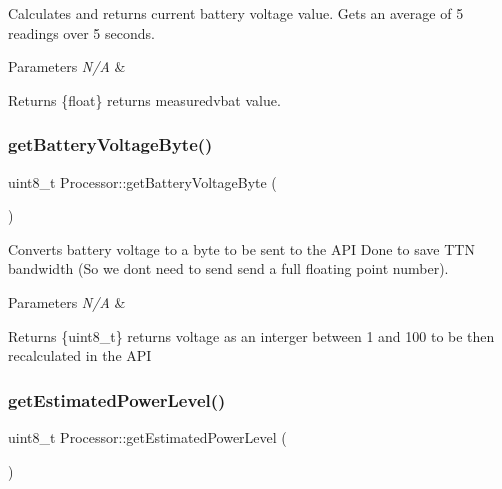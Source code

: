 Calculates and returns current battery voltage value. Gets an average of 5 readings over 5 seconds. 
\begin{DoxyParams}{Parameters}
{\em N/A} & \\
\hline
\end{DoxyParams}
\begin{DoxyReturn}{Returns}
\{float\} returns measuredvbat value. 
\end{DoxyReturn}
\mbox{\label{class_processor_ae2385e41f86895199fb37e524a3f1e86}} 
\subsubsection{\texorpdfstring{get\+Battery\+Voltage\+Byte()}{getBatteryVoltageByte()}}
{\footnotesize\ttfamily uint8\+\_\+t Processor\+::get\+Battery\+Voltage\+Byte (\begin{DoxyParamCaption}{ }\end{DoxyParamCaption})}

Converts battery voltage to a byte to be sent to the A\+PI Done to save T\+TN bandwidth (So we don\textquotesingle{}t need to send send a full floating point number). 
\begin{DoxyParams}{Parameters}
{\em N/A} & \\
\hline
\end{DoxyParams}
\begin{DoxyReturn}{Returns}
\{uint8\+\_\+t\} returns voltage as an interger between 1 and 100 to be then recalculated in the A\+PI 
\end{DoxyReturn}
\mbox{\label{class_processor_a78b74d3be91182a263f77ff0f250408d}} 
\subsubsection{\texorpdfstring{get\+Estimated\+Power\+Level()}{getEstimatedPowerLevel()}}
{\footnotesize\ttfamily uint8\+\_\+t Processor\+::get\+Estimated\+Power\+Level (\begin{DoxyParamCaption}{ }\end{DoxyParamCaption})}

